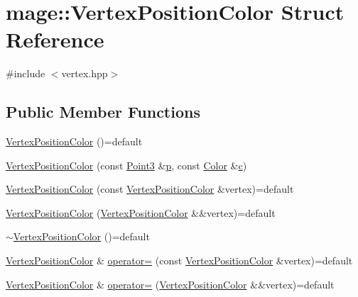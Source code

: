 \hypertarget{structmage_1_1_vertex_position_color}{}\section{mage\+:\+:Vertex\+Position\+Color Struct Reference}
\label{structmage_1_1_vertex_position_color}


{\ttfamily \#include $<$vertex.\+hpp$>$}

\subsection*{Public Member Functions}
\begin{DoxyCompactItemize}
\item 
\hyperlink{structmage_1_1_vertex_position_color_a9346fd83bc634a105b3d81231c42136b}{Vertex\+Position\+Color} ()=default
\item 
\hyperlink{structmage_1_1_vertex_position_color_aa41e2d55816bf687261f91f8e79846f2}{Vertex\+Position\+Color} (const \hyperlink{structmage_1_1_point3}{Point3} \&\hyperlink{structmage_1_1_vertex_position_color_afe40a78afb8e13e742d93d5092b1a614}{p}, const \hyperlink{structmage_1_1_color}{Color} \&\hyperlink{structmage_1_1_vertex_position_color_a4a9e50e66f73e93a9a529c0c940e2458}{c})
\item 
\hyperlink{structmage_1_1_vertex_position_color_a35fcbd35fe6384affee2b5dfabd29016}{Vertex\+Position\+Color} (const \hyperlink{structmage_1_1_vertex_position_color}{Vertex\+Position\+Color} \&vertex)=default
\item 
\hyperlink{structmage_1_1_vertex_position_color_a0fdc77311a4b9b1c97f4f7ab83990d26}{Vertex\+Position\+Color} (\hyperlink{structmage_1_1_vertex_position_color}{Vertex\+Position\+Color} \&\&vertex)=default
\item 
\hyperlink{structmage_1_1_vertex_position_color_a18c4400389dfd47482a7d0901d904aec}{$\sim$\+Vertex\+Position\+Color} ()=default
\item 
\hyperlink{structmage_1_1_vertex_position_color}{Vertex\+Position\+Color} \& \hyperlink{structmage_1_1_vertex_position_color_aa621ed54ab2eee82d636a5805db5d28b}{operator=} (const \hyperlink{structmage_1_1_vertex_position_color}{Vertex\+Position\+Color} \&vertex)=default
\item 
\hyperlink{structmage_1_1_vertex_position_color}{Vertex\+Position\+Color} \& \hyperlink{structmage_1_1_vertex_position_color_a2c78f670a027a3891266dba88bfe9e87}{operator=} (\hyperlink{structmage_1_1_vertex_position_color}{Vertex\+Position\+Color} \&\&vertex)=default
\end{DoxyCompactItemize}
